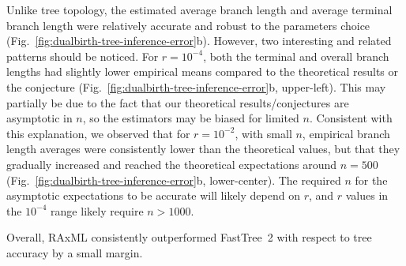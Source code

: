 Unlike tree topology, the estimated average branch length and average terminal branch length were relatively accurate and robust to the parameters choice (Fig.~\ref{fig:dualbirth-tree-inference-error}b). However, two interesting and related patterns should be noticed. For $r=10^{-4}$, both the terminal and overall branch lengths had slightly lower empirical means compared to the theoretical results or the conjecture (Fig.~\ref{fig:dualbirth-tree-inference-error}b, upper-left). This may partially be due to the fact that our theoretical results/conjectures are asymptotic in $n$, so the estimators may be biased for limited $n$. Consistent with this explanation, we observed that for $r=10^{-2}$, with small $n$, empirical branch length averages were consistently lower than the theoretical values, but that they gradually increased and reached the theoretical expectations around $n=500$ (Fig.~\ref{fig:dualbirth-tree-inference-error}b, lower-center). The required $n$ for the asymptotic expectations to be accurate will likely depend on $r$, and $r$ values in the $10^{-4}$ range likely require $n>1000$.

Overall, RAxML consistently outperformed FastTree~2 with respect to tree accuracy by a small margin.

